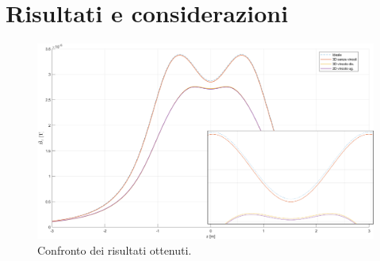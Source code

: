 \documentclass[a4paper, 11pt]{article}
\begin{document}
\newpage
\section*{Risultati e considerazioni}

\begin{figure}[H]
    \centering
        \includegraphics[width=16cm]{assets/figure12}
        \caption{Confronto dei risultati ottenuti.}
\end{figure}
\end{document}
